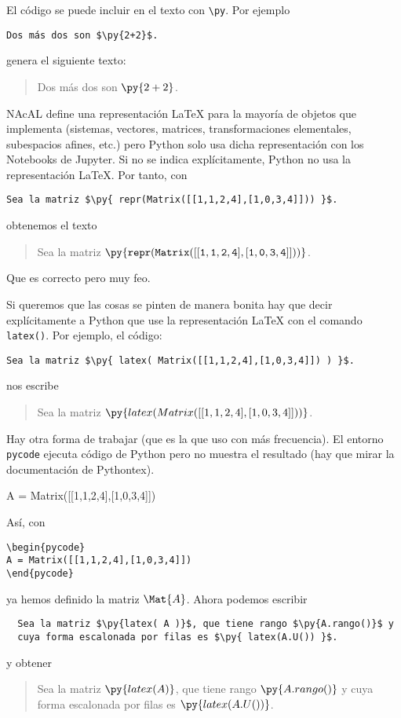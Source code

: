 \documentclass[12pt,a4paper]{article} %
\begin{document}
El código se puede incluir en el texto con \verb+\py+. Por ejemplo
\begin{Verbatim}
Dos más dos son $\py{2+2}$.
\end{Verbatim}
genera el siguiente texto:
\begin{quote}
  Dos más dos son $\py{2+2}$.
\end{quote}

NAcAL define una representación \LaTeX{} para la mayoría de objetos
que implementa (sistemas, vectores, matrices, transformaciones
elementales, subespacios afines, etc.) pero Python solo usa dicha
representación con los Notebooks de Jupyter. Si no se indica
explícitamente, Python no usa la representación \LaTeX{}. Por tanto,
con
\begin{Verbatim}
Sea la matriz $\py{ repr(Matrix([[1,1,2,4],[1,0,3,4]])) }$.
\end{Verbatim}
obtenemos el texto
\begin{quote}
  Sea la matriz $\mathtt{\py{ repr(Matrix([[1,1,2,4],[1,0,3,4]])) }}$.
\end{quote}
Que es correcto pero muy feo.
\medskip


Si queremos que las cosas se pinten de manera bonita hay que decir
explícitamente a Python que use la representación \LaTeX{} con el
comando \texttt{latex()}. Por ejemplo, el código:

\begin{Verbatim}
Sea la matriz $\py{ latex( Matrix([[1,1,2,4],[1,0,3,4]]) ) }$.
\end{Verbatim}
nos escribe
\begin{quote}
  Sea la matriz $\py{ latex( Matrix([[1,1,2,4],[1,0,3,4]]) ) }$.
\end{quote}
\medskip


Hay otra forma de trabajar (que es la que uso con más frecuencia). El
entorno \texttt{pycode} ejecuta código de Python pero no muestra el
resultado (hay que mirar la documentación de Pythontex).
\begin{pycode}
A = Matrix([[1,1,2,4],[1,0,3,4]])
\end{pycode}  
Así, con
\begin{Verbatim}
\begin{pycode}
A = Matrix([[1,1,2,4],[1,0,3,4]])
\end{pycode}  
\end{Verbatim}
ya hemos definido la matriz $\Mat{A}$. Ahora podemos escribir
\begin{Verbatim}
  Sea la matriz $\py{latex( A )}$, que tiene rango $\py{A.rango()}$ y
  cuya forma escalonada por filas es $\py{ latex(A.U()) }$.
\end{Verbatim}
y obtener
\begin{quote}
  Sea la matriz $\py{latex( A )}$, que tiene rango $\py{A.rango()}$ y
  cuya forma escalonada por filas es $\py{ latex(A.U()) }$.
\end{quote}
\end{document}
